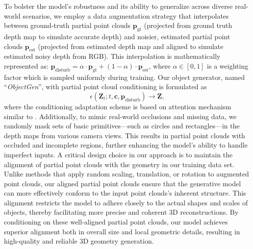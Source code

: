 To bolster the model's robustness and its ability to generalize across diverse real-world scenarios, we employ a data augmentation strategy that interpolates between ground-truth partial point clouds $\bm{p}_\text{gt}$ (projected from ground truth depth map to simulate accurate depth) and noisier, estimated partial point clouds $\bm{p}_\text{est}$ (projected from estimated depth map and aligned to simulate estimated noisy depth from RGB). This interpolation is mathematically represented as:
 $  \bm{p}_\text{disturb} = \alpha\cdot \bm{p}_\text{gt} +(1-\alpha)\cdot \bm{p}_\text{est}$,
where $\alpha\in[0,1]$ is a weighting factor which is sampled uniformly during training. Our object generator, named ``\textit{ObjectGen}'', with partial point cloud conditioning is formulated as
\begin{equation}
    \epsilon (\bm{Z}_t; t,\bm{c},\bm{p}_\text{disturb}) \rightarrow \bm{Z},
\end{equation}
where the conditioning adaptation scheme is based on attention mechanism similar to \cite{zhang20233dshape2vecset,zhang2024clay}. %
Additionally, to mimic real-world occlusions and missing data, we randomly mask sets of basic primitives—such as circles and rectangles—in the depth maps from various camera views. This results in partial point clouds with occluded and incomplete regions, further enhancing the model's ability to handle imperfect inputs.
%
A critical design choice in our approach is to maintain the alignment of partial point clouds with the geometry in our training data set. Unlike methods that apply random scaling, translation, or rotation to augmented point clouds, our aligned partial point clouds ensure that the generative model can more effectively conform to the input point clouds's inherent structure. This alignment restricts the model to adhere closely to the actual shapes and scales of objects, thereby facilitating more precise and coherent 3D reconstructions. By conditioning on these well-aligned partial point clouds, our model achieves superior alignment both in overall size and local geometric details, resulting in high-quality and reliable 3D geometry generation.









